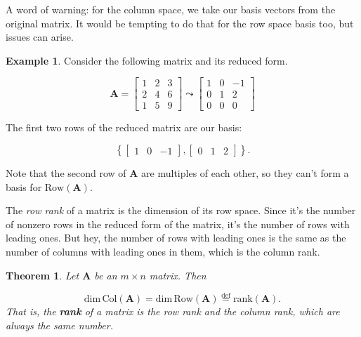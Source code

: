 \documentclass[
]{book}
\newtheorem{theorem}{Theorem}[chapter]
\theoremstyle{definition}
\theoremstyle{definition}
\newtheorem{example}{Example}[chapter]
\theoremstyle{definition}
\theoremstyle{definition}
\theoremstyle{remark}
\begin{document}
A word of warning: for the column space, we take our basis vectors from the original matrix. It would be tempting to do that for the row space basis too, but issues can arise.

\begin{examplebox}

\begin{example}
Consider the following matrix and its reduced form.

\[\mathbf{A}=\begin{bmatrix} 1 & 2 & 3\\2 & 4 & 6\\1 & 5 & 9\end{bmatrix}\leadsto \begin{bmatrix}1 & 0 & -1\\0 & 1 & 2\\0 & 0 & 0\end{bmatrix}\]

The first two rows of the reduced matrix are our basis:

\[\left\{\begin{bmatrix}1 & 0 & -1\end{bmatrix},\begin{bmatrix}0 & 1 & 2\end{bmatrix}\right\}.\]

Note that the second row of \(\mathbf{A}\) are multiples of each other, so they can't form a basis for \(\text{Row}(\mathbf{A}).\)
\end{example}

\end{examplebox}

The \emph{row rank} of a matrix is the dimension of its row space. Since it's the number of nonzero rows in the reduced form of the matrix, it's the number of rows with leading ones. But hey, the number of rows with leading ones is the same as the number of columns with leading ones in them, which is the column rank.

\begin{theorembox}

\begin{theorem}
Let \(\mathbf{A}\) be an \(m\times n\) matrix. Then

\[\text{dim}\,\text{Col}(\mathbf{A})=\text{dim}\,\text{Row}(\mathbf{A})\overset{\text{def}}{=}\text{rank} (\mathbf{A}).\]
That is, the \textbf{rank} of a matrix is the row rank \emph{and} the column rank, which are always the same number.
\end{theorem}

\end{theorembox}
\end{document}
